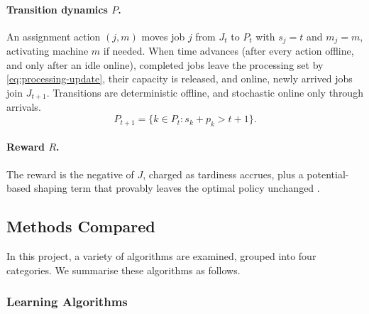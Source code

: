 \documentclass[12pt]{article}
\begin{document}
\paragraph{Transition dynamics $P$.} An assignment action $(j, m)$ moves job $j$ from $J_t$ to $P_t$ with $s_j = t$ and $m_j = m$, activating machine $m$ if needed. When time advances (after every action offline, and only after an idle online), completed jobs leave the processing set by \cref{eq:processing-update}, their capacity is released, and online, newly arrived jobs join $J_{t+1}$. Transitions are deterministic offline, and stochastic online only through arrivals.
\begin{equation}\label{eq:processing-update}
    P_{t+1} = \{k \in P_t : s_k + p_k > t + 1\}.
\end{equation}

\paragraph{Reward $R$.} The reward is the negative of $J$, charged as tardiness accrues, plus a potential-based shaping term that provably leaves the optimal policy unchanged \cite{ng1999shaping}.

\subsection{Methods Compared}\label{sec:baselines}
In this project, a variety of algorithms are examined, grouped into four categories. We summarise these algorithms as follows.

\subsubsection{Learning Algorithms}\label{sec:algorithms}
\end{document}
